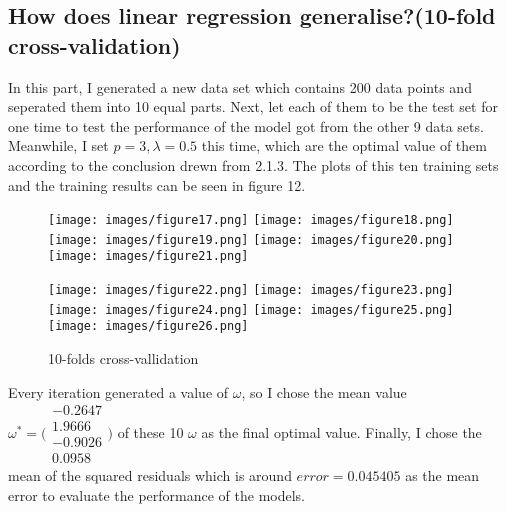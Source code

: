 \documentclass[a4paper, 12pt]{article}
\begin{document}
  \subsection{How does linear regression generalise?(10-fold cross-validation)}
  In this part, I generated a new data set which contains 200 data points and seperated them into 10 equal parts. Next, let each of them to be the test set for one time to test the performance of the model got from the other 9 data sets. Meanwhile, I set $p=3, \lambda=0.5$ this time, which are the optimal value of them according to the conclusion drewn from 2.1.3. The plots of this ten training sets and the training results can be seen in figure 12.
  \begin{figure}[h]
    \centering
    \begin{minipage}[b]{0.45\textwidth}
        \texttt{[image: images/figure17.png]}
        \texttt{[image: images/figure18.png]}
        \texttt{[image: images/figure19.png]}
        \texttt{[image: images/figure20.png]}
        \texttt{[image: images/figure21.png]}
      \end{minipage}%
      \hspace{0.04\textwidth}%
      \begin{minipage}[b]{0.45\textwidth}
        \texttt{[image: images/figure22.png]}
        \texttt{[image: images/figure23.png]}
        \texttt{[image: images/figure24.png]}
        \texttt{[image: images/figure25.png]}
        \texttt{[image: images/figure26.png]}
      \end{minipage}
      \caption{10-folds cross-vallidation}
  \end{figure}
  Every iteration generated a value of $\omega$, so I chose the mean value 
  $\omega^* = 
  \Bigg(
    \begin{array}{c}
      -0.2647 \\
      1.9666  \\
      -0.9026 \\
      0.0958
    \end{array}
  \Bigg)$
  of these 10 $\omega$ as the final optimal value. Finally, I chose the mean of the squared residuals which is around $error = 0.045405$ as the mean error to evaluate the performance of the models. 
\end{document}
